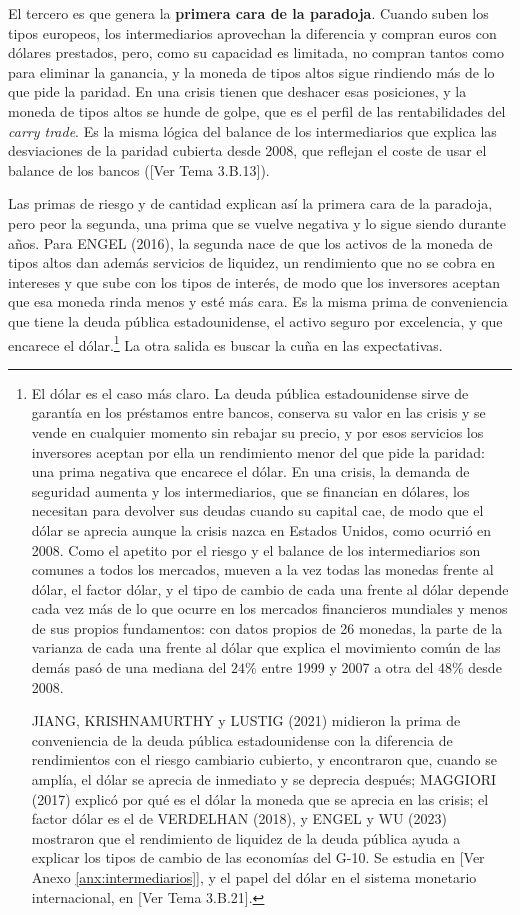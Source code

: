 \documentclass[10pt,a4paper]{article}
\newcommand{\authorfont}[1]{{\fontfamily{EBGaramond-TLF}\selectfont #1}}
\begin{document}
El tercero es que genera la \textbf{primera cara de la paradoja}. Cuando suben los tipos europeos, los intermediarios aprovechan la diferencia y compran euros con dólares prestados, pero, como su capacidad es limitada, no compran tantos como para eliminar la ganancia, y la moneda de tipos altos sigue rindiendo más de lo que pide la paridad. En una crisis tienen que deshacer esas posiciones, y la moneda de tipos altos se hunde de golpe, que es el perfil de las rentabilidades del \textit{carry trade}. Es la misma lógica del balance de los intermediarios que explica las desviaciones de la paridad cubierta desde 2008, que reflejan el coste de usar el balance de los bancos ([\authorfont{Ver Tema 3.B.13}]).

Las primas de riesgo y de cantidad explican así la primera cara de la paradoja, pero peor la segunda, una prima que se vuelve negativa y lo sigue siendo durante años. Para ENGEL (2016), la segunda nace de que los activos de la moneda de tipos altos dan además servicios de liquidez, un rendimiento que no se cobra en intereses y que sube con los tipos de interés, de modo que los inversores aceptan que esa moneda rinda menos y esté más cara. Es la misma prima de conveniencia que tiene la deuda pública estadounidense, el activo seguro por excelencia, y que encarece el dólar.\footnote{%
    El dólar es el caso más claro. La deuda pública estadounidense sirve de garantía en los préstamos entre bancos, conserva su valor en las crisis y se vende en cualquier momento sin rebajar su precio, y por esos servicios los inversores aceptan por ella un rendimiento menor del que pide la paridad: una prima negativa que encarece el dólar. En una crisis, la demanda de seguridad aumenta y los intermediarios, que se financian en dólares, los necesitan para devolver sus deudas cuando su capital cae, de modo que el dólar se aprecia aunque la crisis nazca en Estados Unidos, como ocurrió en 2008. Como el apetito por el riesgo y el balance de los intermediarios son comunes a todos los mercados, mueven a la vez todas las monedas frente al dólar, el factor dólar, y el tipo de cambio de cada una frente al dólar depende cada vez más de lo que ocurre en los mercados financieros mundiales y menos de sus propios fundamentos: con datos propios de 26 monedas, la parte de la varianza de cada una frente al dólar que explica el movimiento común de las demás pasó de una mediana del $24\%$ entre 1999 y 2007 a otra del $48\%$ desde 2008.

    JIANG, KRISHNAMURTHY y LUSTIG (2021) midieron la prima de conveniencia de la deuda pública estadounidense con la diferencia de rendimientos con el riesgo cambiario cubierto, y encontraron que, cuando se amplía, el dólar se aprecia de inmediato y se deprecia después; MAGGIORI (2017) explicó por qué es el dólar la moneda que se aprecia en las crisis; el factor dólar es el de VERDELHAN (2018), y ENGEL y WU (2023) mostraron que el rendimiento de liquidez de la deuda pública ayuda a explicar los tipos de cambio de las economías del G-10. Se estudia en [\authorfont{Ver Anexo \ref{anx:intermediarios}}], y el papel del dólar en el sistema monetario internacional, en [\authorfont{Ver Tema 3.B.21}].
} La otra salida es buscar la cuña en las expectativas.
\end{document}
